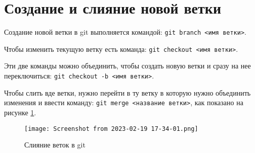 \section{Создание и слияние новой ветки}
Создание новой ветки в git выполняется
командой: \texttt{git~branch~<имя~ветки>}.

Чтобы изменить текущую ветку есть команда: \texttt{git~checkout~<имя~ветки>}.

Эти две команды можно объединить, чтобы создать новую ветки и сразу на нее переключиться: \texttt{git~checkout~-b~<имя~ветки>}.

Чтобы слить вде ветки, нужно перейти в ту ветку в которую нужно объединить изменения и ввести команду: \texttt{git~merge~<название~ветки>}, как показано
на рисунке \ref{2:fig:git:merge}.

\begin{figure}[h!tp]
	\centering
	\texttt{[image: Screenshot from 2023-02-19 17-34-01.png]}
	\caption{Слияние веток в git}
	\label{2:fig:git:merge}
\end{figure}

